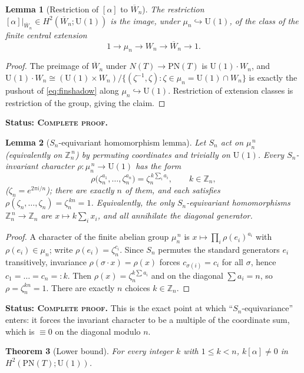 \documentclass[11pt]{article}
\newtheorem{theorem}{Theorem}[section]
\newtheorem{lemma}[theorem]{Lemma}
\theoremstyle{definition}
\newcommand{\U}{\mathrm{U}}
\newcommand{\PN}{\mathrm{PN}}
\newcommand{\Nt}{N(T)}
\newcommand{\Z}{\mathbb{Z}}
\newcommand{\Wn}{\overline{W}_{n}}
\newcommand{\STAT}[1]{\noindent\textbf{Status: #1}}
\newcommand{\COMPLETE}{\textsc{Complete proof}}
\begin{document}
\begin{lemma}[Restriction of {$[\alpha]$} to $\Wn$]\label{lem:restrict}
The restriction $[\alpha]|_{\Wn}\in H^2(\Wn;\U(1))$ is the image, under
$\mu_n\hookrightarrow\U(1)$, of the class of the finite central extension
\begin{equation}\label{eq:finshadow}
1\longrightarrow \mu_n\longrightarrow W_n\longrightarrow \Wn\longrightarrow 1 .
\end{equation}
\end{lemma}
\begin{proof}
The preimage of $\Wn$ under $\Nt\to\PN(T)$ is $\U(1)\cdot W_n$, and
$\U(1)\cdot W_n\cong(\U(1)\times W_n)/\{(\zeta^{-1},\zeta):\zeta\in\mu_n=\U(1)\cap W_n\}$ is
exactly the pushout of \eqref{eq:finshadow} along $\mu_n\hookrightarrow\U(1)$. Restriction
of extension classes is restriction of the group, giving the claim.
\end{proof}
\STAT{\COMPLETE.}

\begin{lemma}[$S_n$-equivariant homomorphism lemma]\label{lem:equiv}
Let $S_n$ act on $\mu_n^{\,n}$ (equivalently on $\Z_n^{\,n}$) by permuting coordinates and
trivially on $\U(1)$. Every $S_n$-invariant character
$\rho\colon\mu_n^{\,n}\to\U(1)$ has the form
\[
\rho\big(\zeta_n^{a_1},\dots,\zeta_n^{a_n}\big)=\zeta_n^{\,k\sum_i a_i},\qquad k\in\Z_n ,
\]
($\zeta_n=e^{2\pi i/n}$); there are exactly $n$ of them, and each satisfies
$\rho(\zeta_n,\dots,\zeta_n)=\zeta_n^{\,kn}=1$. Equivalently, the only $S_n$-equivariant
homomorphisms $\Z_n^{\,n}\to\Z_n$ are $x\mapsto k\sum_i x_i$, and all annihilate the
diagonal generator.
\end{lemma}
\begin{proof}
A character of the finite abelian group $\mu_n^{\,n}$ is $x\mapsto\prod_i\rho(e_i)^{a_i}$
with $\rho(e_i)\in\mu_n$; write $\rho(e_i)=\zeta_n^{c_i}$. Since $S_n$ permutes the standard
generators $e_i$ transitively, invariance $\rho(\sigma\cdot x)=\rho(x)$ forces
$c_{\sigma(i)}=c_i$ for all $\sigma$, hence $c_1=\dots=c_n=:k$. Then
$\rho(x)=\zeta_n^{k\sum a_i}$ and on the diagonal $\sum a_i=n$, so
$\rho=\zeta_n^{kn}=1$. There are exactly $n$ choices $k\in\Z_n$.
\end{proof}
\STAT{\COMPLETE.} This is the exact point at which ``$S_n$-equivariance'' enters: it forces
the invariant character to be a multiple of the coordinate sum, which is $\equiv0$ on the
diagonal modulo $n$.

\begin{theorem}[Lower bound]\label{thm:lower}
For every integer $k$ with $1\le k<n$, $k[\alpha]\neq0$ in $H^2(\PN(T);\U(1))$.
\end{theorem}
\end{document}
